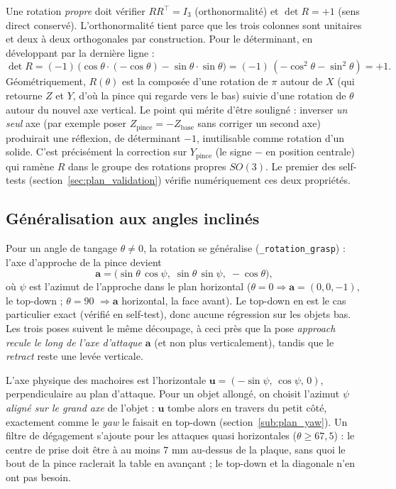 Une rotation \emph{propre} doit vérifier \(R R^\top = I_3\) (orthonormalité) et
\(\det R = +1\) (sens direct conservé). L'orthonormalité tient parce que les trois
colonnes sont unitaires et deux à deux orthogonales par construction. Pour le
déterminant, en développant par la dernière ligne :
\[
  \det R = (-1)\,\big(\cos\theta \cdot (-\cos\theta) - \sin\theta \cdot \sin\theta\big)
         = (-1)\,(-\cos^2\theta - \sin^2\theta) = +1 .
\]
Géométriquement, \(R(\theta)\) est la composée d'une rotation de \(\pi\) autour de
\(X\) (qui retourne \(Z\) et \(Y\), d'où la pince qui regarde vers le bas) suivie
d'une rotation de \(\theta\) autour du nouvel axe vertical. Le point qui mérite
d'être souligné : inverser \emph{un seul} axe (par exemple poser
\(Z_{\text{pince}} = -Z_{\text{base}}\) sans corriger un second axe) produirait
une réflexion, de déterminant \(-1\), inutilisable comme rotation d'un solide.
C'est précisément la correction sur \(Y_{\text{pince}}\) (le signe \(-\) en
position centrale) qui ramène \(R\) dans le groupe des rotations propres
\(SO(3)\). Le premier des self-tests
(section~\ref{sec:plan_validation}) vérifie numériquement ces deux propriétés.

\subsection{Généralisation aux angles inclinés}
\label{sub:plan_incline}

Pour un angle de tangage \(\theta \neq 0\), la rotation se généralise
(\texttt{\_rotation\_grasp}) : l'axe d'approche de la pince devient
\[
  \mathbf{a} = \big(\sin\theta\,\cos\psi,\; \sin\theta\,\sin\psi,\; -\cos\theta\big),
\]
où \(\psi\) est l'azimut de l'approche dans le plan horizontal
(\(\theta = 0 \Rightarrow \mathbf{a} = (0,0,-1)\), le top-down ; \(\theta = 90\)\textdegree{}
\(\Rightarrow \mathbf{a}\) horizontal, la face avant). Le top-down en est le cas
particulier exact (vérifié en self-test), donc aucune régression sur les objets
bas. Les trois poses suivent le même découpage, à ceci près que la pose
\textit{approach} \emph{recule le long de l'axe d'attaque} \(\mathbf{a}\) (et non
plus verticalement), tandis que le \textit{retract} reste une levée verticale.

L'axe physique des machoires est l'horizontale \(\mathbf{u} = (-\sin\psi,\,
\cos\psi,\, 0)\), perpendiculaire au plan d'attaque. Pour un objet allongé, on
choisit l'azimut \(\psi\) \emph{aligné sur le grand axe} de l'objet : \(\mathbf{u}\)
tombe alors en travers du petit côté, exactement comme le \textit{yaw} le faisait
en top-down (section~\ref{sub:plan_yaw}). Un filtre de dégagement s'ajoute pour les
attaques quasi horizontales (\(\theta \ge 67{,}5\)\textdegree) : le centre de prise
doit être à au moins \(7\) mm au-dessus de la plaque, sans quoi le bout de la pince
raclerait la table en avançant ; le top-down et la diagonale n'en ont pas besoin.

